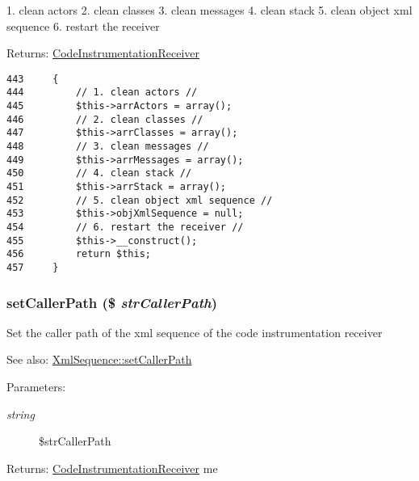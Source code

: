1. clean actors 2. clean classes 3. clean messages 4. clean stack 5. clean object xml sequence 6. restart the receiver

\begin{Desc}
\item[Returns:]\hyperlink{class_code_instrumentation_receiver}{CodeInstrumentationReceiver} \end{Desc}


\begin{Code}\begin{verbatim}443     {
444         // 1. clean actors //
445         $this->arrActors = array();
446         // 2. clean classes //
447         $this->arrClasses = array();
448         // 3. clean messages //
449         $this->arrMessages = array();
450         // 4. clean stack //
451         $this->arrStack = array();
452         // 5. clean object xml sequence //
453         $this->objXmlSequence = null;
454         // 6. restart the receiver //
455         $this->__construct();
456         return $this;
457     }
\end{verbatim}
\end{Code}


\hypertarget{class_code_instrumentation_receiver_bdded6991e674ce82f04f701972ebf9f}{
\subsubsection[{setCallerPath}]{\setlength{\rightskip}{0pt plus 5cm}setCallerPath (\$ {\em strCallerPath})}}
\label{class_code_instrumentation_receiver_bdded6991e674ce82f04f701972ebf9f}


Set the caller path of the xml sequence of the code instrumentation receiver

\begin{Desc}
\item[See also:]\hyperlink{class_xml_sequence_bdded6991e674ce82f04f701972ebf9f}{XmlSequence::setCallerPath} \end{Desc}
\begin{Desc}
\item[Parameters:]
\begin{description}
\item[{\em string}]\$strCallerPath \end{description}
\end{Desc}
\begin{Desc}
\item[Returns:]\hyperlink{class_code_instrumentation_receiver}{CodeInstrumentationReceiver} me \end{Desc}


